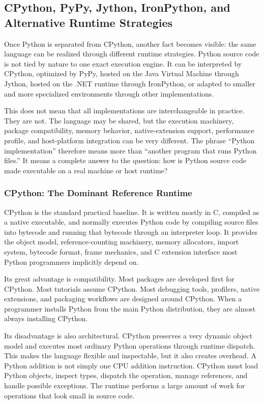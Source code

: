 \subsection{CPython, PyPy, Jython, IronPython, and Alternative Runtime Strategies}

Once Python is separated from CPython, another fact becomes visible: the same language can be realized through different runtime strategies. Python source code is not tied by nature to one exact execution engine. It can be interpreted by CPython, optimized by PyPy, hosted on the Java Virtual Machine through Jython, hosted on the .NET runtime through IronPython, or adapted to smaller and more specialized environments through other implementations.

This does not mean that all implementations are interchangeable in practice. They are not. The language may be shared, but the execution machinery, package compatibility, memory behavior, native-extension support, performance profile, and host-platform integration can be very different. The phrase ``Python implementation'' therefore means more than ``another program that runs Python files.'' It means a complete answer to the question: how is Python source code made executable on a real machine or host runtime?

\subsubsection{CPython: The Dominant Reference Runtime}

CPython is the standard practical baseline. It is written mostly in C, compiled as a native executable, and normally executes Python code by compiling source files into bytecode and running that bytecode through an interpreter loop. It provides the object model, reference-counting machinery, memory allocators, import system, bytecode format, frame mechanics, and C extension interface most Python programmers implicitly depend on.

Its great advantage is compatibility. Most packages are developed first for CPython. Most tutorials assume CPython. Most debugging tools, profilers, native extensions, and packaging workflows are designed around CPython. When a programmer installs Python from the main Python distribution, they are almost always installing CPython.

Its disadvantage is also architectural. CPython preserves a very dynamic object model and executes most ordinary Python operations through runtime dispatch. This makes the language flexible and inspectable, but it also creates overhead. A Python addition is not simply one CPU addition instruction. CPython must load Python objects, inspect types, dispatch the operation, manage references, and handle possible exceptions. The runtime performs a large amount of work for operations that look small in source code.

